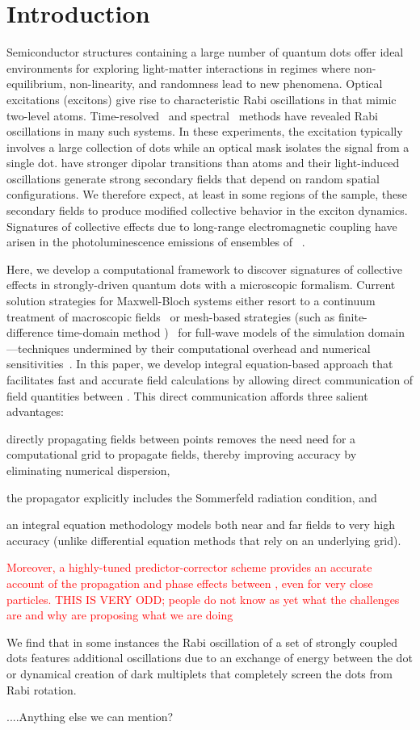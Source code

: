 \section{\label{sec:introduction}Introduction}
Semiconductor structures containing a large number of quantum dots offer ideal environments for exploring light-matter interactions in regimes where non-equilibrium, non-linearity, and randomness lead to new phenomena.
Optical excitations (excitons) give rise to characteristic Rabi oscillations in \qds{} that mimic two-level atoms.
Time-resolved~\cite{stievater,shih} and spectral~\cite{kamada} methods have revealed Rabi oscillations in many such systems.
In these experiments, the excitation typically involves a large collection of dots while an optical mask isolates the signal from a single dot.
\Qds{} have stronger dipolar transitions than atoms and their light-induced oscillations generate strong secondary fields that depend on random spatial configurations.
We therefore expect, at least in some regions of the sample, these secondary fields to produce modified collective behavior in the exciton dynamics.
Signatures of collective effects due to long-range electromagnetic coupling have arisen in the photoluminescence emissions of ensembles of \qds{}~\cite{forchel}.

Here, we develop a computational framework to discover signatures of collective effects in strongly-driven quantum dots with a microscopic formalism.
Current solution strategies for Maxwell-Bloch systems either resort to a continuum treatment of macroscopic fields~\cite{} or mesh-based strategies (such as finite-difference time-domain method )~\cite{Vanneste2001, Fratalocchi2008} for full-wave models of the simulation domain---techniques undermined by their computational overhead and numerical sensitivities~\cite{Baczewski2013}.
In this paper, we develop integral equation-based approach that facilitates fast and accurate field calculations by allowing direct communication of field quantities between \qds{}.
This direct communication affords three salient advantages:
  \begin{inparaenum}[(i)]
    \item directly propagating fields between points removes the need need for a computational grid to propagate fields, thereby improving accuracy by eliminating numerical dispersion,
    \item the propagator explicitly includes the Sommerfeld radiation condition, and
    \item an integral equation methodology models both near and far fields to very high accuracy (unlike differential equation methods that rely on an underlying grid).
  \end{inparaenum}
\textcolor{red}{Moreover, a highly-tuned predictor-corrector scheme provides an accurate account of the propagation and phase effects between \qds{}, even for very close particles.
THIS IS VERY ODD; people do not know as yet what the challenges are and why are proposing what we are doing}

We find that in some instances the Rabi oscillation of a set of strongly coupled dots features additional oscillations due to an exchange of energy between the dot or dynamical creation of dark multiplets that completely screen the dots from Rabi rotation.


....Anything else we can mention?
